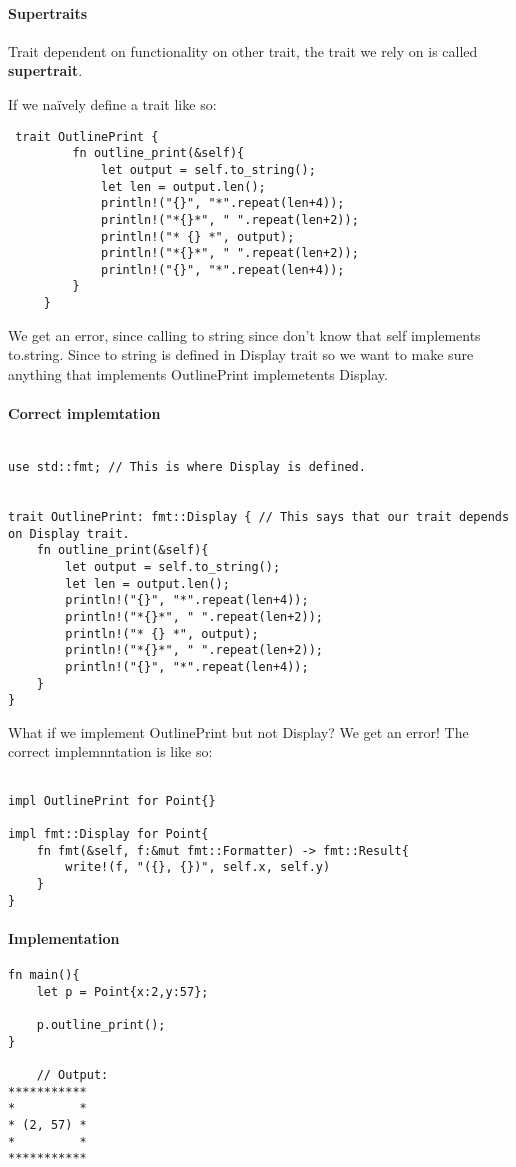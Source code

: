 \paragraph*{Supertraits}

\begin{definition}
    Trait dependent on functionality on other trait, the trait we rely on is called \textbf{supertrait}.

    If we naïvely define a trait like so:\begin{lstlisting}       
 trait OutlinePrint {
         fn outline_print(&self){
             let output = self.to_string(); 
             let len = output.len();
             println!("{}", "*".repeat(len+4));
             println!("*{}*", " ".repeat(len+2));
             println!("* {} *", output);
             println!("*{}*", " ".repeat(len+2));
             println!("{}", "*".repeat(len+4));
         }
     }
    \end{lstlisting}

We get an error, since  calling to string since don't know that self implements to.string. Since to string is defined in Display trait so we want to make sure anything that implements OutlinePrint implemetents Display.

\paragraph*{Correct implemtation}\begin{lstlisting}
    
use std::fmt; // This is where Display is defined.


trait OutlinePrint: fmt::Display { // This says that our trait depends on Display trait.
    fn outline_print(&self){
        let output = self.to_string(); 
        let len = output.len();
        println!("{}", "*".repeat(len+4));
        println!("*{}*", " ".repeat(len+2));
        println!("* {} *", output);
        println!("*{}*", " ".repeat(len+2));
        println!("{}", "*".repeat(len+4));
    }
}
\end{lstlisting}

What if we implement OutlinePrint but not Display? We get an error! The correct implemnntation is like so:\begin{lstlisting}
    
impl OutlinePrint for Point{}

impl fmt::Display for Point{
    fn fmt(&self, f:&mut fmt::Formatter) -> fmt::Result{
        write!(f, "({}, {})", self.x, self.y)
    }
}
\end{lstlisting}

\paragraph*{Implementation}\begin{lstlisting}
fn main(){
    let p = Point{x:2,y:57};

    p.outline_print();
}

    // Output:
***********
*         *
* (2, 57) *
*         *
***********
\end{lstlisting}
\end{definition}


